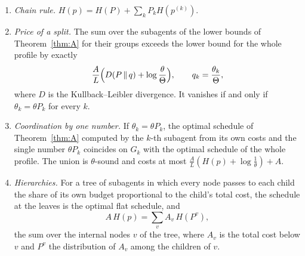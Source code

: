 \begin{mainthm}[Subagents]\label{thm:H}
\begin{enumerate}[label=\textup{(\roman*)},leftmargin=2.2em,itemsep=1pt]
\item \emph{Chain rule.} $H(p)=H(P)+\sum_{k}P_{k}H(p^{(k)})$.
\item \emph{Price of a split.} The sum over the subagents of the lower bounds of Theorem~\ref{thm:A} for their groups exceeds the lower bound for the whole profile by exactly
\begin{equation}\label{eq:splitprice}
\frac{A}{L}\Bigl(D(P\,\|\,q)+\log\frac{\theta}{\Theta}\Bigr),\qquad q_{k}=\frac{\theta_{k}}{\Theta},
\end{equation}
where $D$ is the Kullback--Leibler divergence. It vanishes if and only if $\theta_{k}=\theta P_{k}$ for every $k$.
\item \emph{Coordination by one number.} If $\theta_{k}=\theta P_{k}$, the optimal schedule of Theorem~\ref{thm:A} computed by the $k$-th subagent from its own costs and the single number $\theta P_{k}$ coincides on $G_{k}$ with the optimal schedule of the whole profile. The union is $\theta$-sound and costs at most $\frac AL(H(p)+\log\frac1\theta)+A$.
\item \emph{Hierarchies.} For a tree of subagents in which every node passes to each child the share of its own budget proportional to the child's total cost, the schedule at the leaves is the optimal flat schedule, and
\begin{equation}\label{eq:treeentropy}
A\,H(p)=\sum_{v}A_{v}\,H(P^{v}),
\end{equation}
the sum over the internal nodes $v$ of the tree, where $A_{v}$ is the total cost below $v$ and $P^{v}$ the distribution of $A_{v}$ among the children of $v$.
\end{enumerate}
\end{mainthm}

